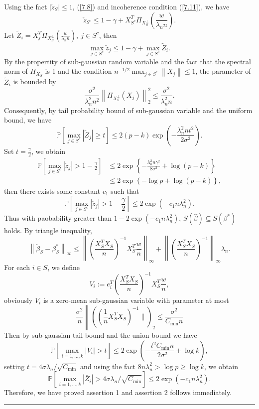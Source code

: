 \documentclass[12pt]{article}
\numberwithin{equation}{section}
\newenvironment{proof}{{\bf Proof:}}{\hfill\rule{2mm}{2mm}}
\begin{document}
\begin{proof}
	Using the fact $|\check{z}_S|\leq 1$, (\ref{7.8}) and incoherence condition (\ref{7.11}), we have
	$$
	\check{z}_{S^c}\leq 1-\gamma+X_{S^c}^T\Pi_{X_{S}^{\perp}}\left(\frac{w}{\lambda_{n} n}\right).
	$$
	Let $\tilde{Z}_i=X_j^T\Pi_{X_{S}^{\perp}}\left(\frac{w}{\lambda_{n} n}\right),\ j\in S^c$, then 
	$$
	\max_{j \in S^{c}}	\check{z}_{j}\leq 1-\gamma+\max_{j \in S^{c}}\tilde{Z}_i.
	$$
	By the propertity of sub-gaussian random variable and the fact that the spectral norm of $\Pi_{X_{S}}$ is 1 and the condition $n^{-1 / 2} \max _{j \in S^{c}}\left\|X_{j}\right\| \leq 1$, the parameter of $\tilde{Z}_i$ is bounded by
	$$
	\frac{\sigma^{2}}{\lambda_{n}^{2} n^{2}}\left\|\Pi_{X_{S}^{\perp}}\left(X_{j}\right)\right\|_{2}^{2} \leq \frac{\sigma^{2}}{\lambda_{n}^{2} n}.
	$$
	Consequently, by tail probability bound of sub-gaussian variable and the uniform bound, we have
	$$
	\mathbb{P}\left[\max _{j \in S^{c}}\left|\widetilde{Z}_{j}\right| \geq t\right] \leq 2(p-k) \exp \left(-\frac{\lambda_{n}^{2} n t^{2}}{2 \sigma^{2}}\right).
	$$
	Set $t=\frac{\gamma}{2}$, we obtain
	\begin{align*}
	\mathbb{P}\left[\max _{j \in S^{c}}\left|\check{z}_{j}\right| > 1-\frac{\gamma}{2}\right]& \leq 2 \exp \left\{-\frac{\lambda_{n}^{2} n \gamma^{2}}{8 \sigma^{2}}+\log (p-k)\right\}\\
	&\leq 2 \exp \left\{-\log p+\log (p-k)\right\},
	\end{align*}
	then there exists some constant $c_1$ such that 
	$$
	\mathbb{P}\left[\max _{j \in S^{c}}\left|\check{z}_{j}\right| > 1-\frac{\gamma}{2}\right]\leq 2\exp \left(-c_{1} n \lambda_{n}^{2}\right).
	$$
	Thus with paobability greater than $1-2\exp \left(-c_{1} n \lambda_{n}^{2}\right)$, $S(\widehat{\beta}) \subseteq S\left(\beta^{*}\right)$ holds.
	By triangle inequality,
	$$
	\left\|\check{\beta}_{S}-\beta_{S}^{*}\right\|_{\infty}\leq \left\|\left(\frac{X_{S}^{T} X_{S}}{n}\right)^{-1} X_{S}^{T} \frac{w}{n}\right\|_{\infty}+\left\|\left(\frac{X_{S}^{T} X_{S}}{n}\right)^{-1}\right\|_{\infty} \lambda_{n}.
	$$
	For each $i\in S$, we define
	$$
	V_i:=e_i^T\left(\frac{X_{S}^{T} X_{S}}{n}\right)^{-1} X_{S}^{T} \frac{w}{n},
	$$
	obviously $V_i$ is a zero-mean sub-gaussian variable with parameter at most
	$$
	\frac{\sigma^{2}}{n}\left\|\left(\left(\frac{1}{n} X_{S}^{T} X_{S}\right)^{-1} \|\right)_{2} \leq \frac{\sigma^{2}}{C_{\min } n}\right.
	$$
	Then by sub-gaussian tail bound and the union bound we have
	$$
	\mathbb{P}\left[\max _{i=1, \ldots, k}\left|V_{i}\right|>t\right] \leq 2 \exp \left(-\frac{t^{2} C_{\min } n}{2 \sigma^{2}}+\log k\right),
	$$
	setting $t= 4 \sigma \lambda_{n} / \sqrt{C_{\min }}$ and using the fact $8 n \lambda_{n}^{2}>\log p \geq \log k$, we obtain
	$$
	\mathbb{P}\left[\max _{i=1, \ldots, k}\left|\bar{Z}_{i}\right|>4 \sigma \lambda_{n} / \sqrt{C_{\min }}\right]\leq 2\exp \left(-c_{1} n \lambda_{n}^{2}\right).
	$$
	Therefore, we have proved assertion 1 and assertion 2 follows immediately.
\end{proof}
\end{document}
